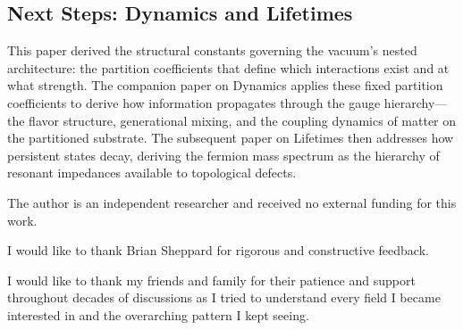 \subsection{Next Steps: Dynamics and Lifetimes}

This paper derived the structural constants governing the vacuum's nested architecture: the partition coefficients that define which interactions exist and at what strength. The companion paper on Dynamics applies these fixed partition coefficients to derive how information propagates through the gauge hierarchy---the flavor structure, generational mixing, and the coupling dynamics of matter on the partitioned substrate. The subsequent paper on Lifetimes then addresses how persistent states decay, deriving the fermion mass spectrum as the hierarchy of resonant impedances available to topological defects.

\begin{acknowledgments}
The author is an independent researcher and received no external funding for this work.

I would like to thank Brian Sheppard for rigorous and constructive feedback.

I would like to thank my friends and family for their patience and support throughout decades of discussions as I tried to understand every field I became interested in and the overarching pattern I kept seeing.
\end{acknowledgments}
